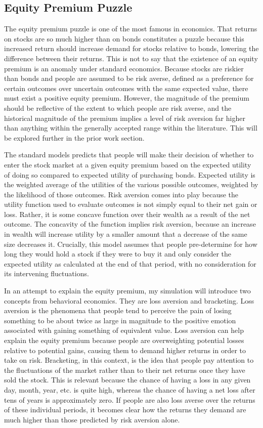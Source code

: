 \documentclass[10pt,twocolumn]{article}
\begin{document}
\subsection{Equity Premium Puzzle}
The equity premium puzzle is one of the most famous in economics. That returns on stocks are so much higher than on bonds constitutes a puzzle because this increased return should increase demand for stocks relative to bonds, lowering the difference between their returns. This is not to say that the existence of an equity premium is an anomaly under standard economics. Because stocks are riskier than bonds and people are assumed to be risk averse, defined as a preference for certain outcomes over uncertain outcomes with the same expected value, there must exist a positive equity premium. However, the magnitude of the premium should be reflective of the extent to which people are risk averse, and the historical magnitude of the premium implies a level of risk aversion far higher than anything within the generally accepted range within the literature. This will be explored further in the prior work section. 

The standard models predicts that people will make their decision of whether to enter the stock market at a given equity premium based on the expected utility of doing so compared to expected utility of purchasing bonds. Expected utility is the weighted average of the utilities of the various possible outcomes, weighted by the likelihood of those outcomes. Risk aversion comes into play because the utility function used to evaluate outcomes is not simply equal to their net gain or loss. Rather, it is some concave function over their wealth as a result of the net outcome. The concavity of the function implies risk aversion, because an increase in wealth will increase utility by a smaller amount that a decrease of the same size decreases it. Crucially, this model assumes that people pre-determine for how long they would hold a stock if they were to buy it and only consider the expected utility as calculated at the end of that period, with no consideration for its intervening fluctuations. 

In an attempt to explain the equity premium, my simulation will introduce two concepts from behavioral economics. They are loss aversion and bracketing. Loss aversion is the phenomena that people tend to perceive the pain of losing something to be about twice as large in magnitude to the positive emotion associated with gaining something of equivalent value. Loss aversion can help explain the equity premium because people are overweighting potential losses relative to potential gains, causing them to demand higher returns in order to take on risk. Bracketing, in this context, is the idea that people pay attention to the fluctuations of the market rather than to their net returns once they have sold the stock. This is relevant because the chance of having a loss in any given day, month, year, etc. is quite high, whereas the chance of having a net loss after tens of years is approximately zero. If people are also loss averse over the returns of these individual periods, it becomes clear how the returns they demand are much higher than those predicted by risk aversion alone.
\end{document}
